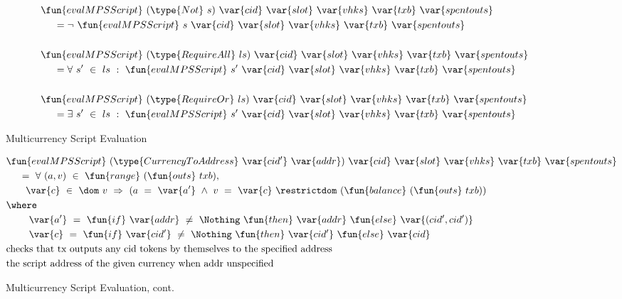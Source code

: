 \begin{figure*}[htb]
\begin{align*}
    &\fun{evalMPSScript}~(\type{Not}~s)~\var{cid}~\var{slot}~\var{vhks}
    ~\var{txb}~\var{spentouts}
   \\
    &~~~~ = \neg ~\fun{evalMPSScript}~s~\var{cid}~\var{slot}~\var{vhks}
    ~\var{txb}~\var{spentouts}\\~\\
    &\fun{evalMPSScript}~(\type{RequireAll}~ls)~\var{cid}~\var{slot}~\var{vhks}
    ~\var{txb}~\var{spentouts}
   \\
    &~~~~ = \forall ~s'~ \in~ ls~:~\fun{evalMPSScript}~s'~\var{cid}~\var{slot}~\var{vhks}
    ~\var{txb}~\var{spentouts}\\~\\
    &\fun{evalMPSScript}~(\type{RequireOr}~ls)~\var{cid}~\var{slot}~\var{vhks}
    ~\var{txb}~\var{spentouts}
   \\
    &~~~~ = \exists ~s'~ \in~ ls~:~\fun{evalMPSScript}~s'~\var{cid}~\var{slot}~\var{vhks}
    ~\var{txb}~\var{spentouts}\\
  \end{align*}
  \caption{Multicurrency Script Evaluation}
  \label{fig:defs:tx-mc-eval}
\end{figure*}



\begin{figure*}[htb]
  \begin{align*}
    & \fun{evalMPSScript}
     ~(\type{CurrencyToAddress}~\var{cid'}~\var{addr})~\var{cid}~ \var{slot}~\var{vhks} ~\var{txb}~\var{spentouts} \\
    &~~~~ =~ \forall~(a, v)~\in~\fun{range}~(\fun{outs}~txb),~\\
    &~~~~~~ \var{c}~\in~\dom~v~\Rightarrow~(a~=~ \var{a'} ~\wedge~
                       v~=~\var{c}~ \restrictdom~(\fun{balance}~(\fun{outs}~txb)) \\
    & \where \\
    & ~~~~~~~ \var{a'}~=~\fun{if}~ \var{addr}~\neq~\Nothing~\fun{then}~\var{addr}~\fun{else}~\var{(cid',cid')} \\
    & ~~~~~~~ \var{c}~=~\fun{if}~ \var{cid'}~\neq~\Nothing~\fun{then}~\var{cid'}~\fun{else}~\var{cid} \\
    & \text{checks that tx outputs any cid tokens by themselves to the specified address} \\
    & \text {the script address of the given currency when addr unspecified}
    \end{align*}
    \caption{Multicurrency Script Evaluation, cont.}
    \label{fig:defs:tx-mc-eval-2}
\end{figure*}

